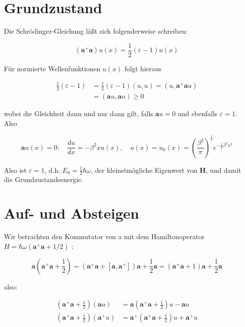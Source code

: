 \documentclass[10pt, letterpaper]{article}
\begin{document}
\section*{Grundzustand}
Die Schrödinger-Gleichung läßt sich folgenderweise schreiben:

$$
\left(\mathbf{a}^{+} \mathbf{a}\right) u(x)=\frac{1}{2}(\varepsilon-1) u(x)
$$

Für normierte Wellenfunktionen $u(x)$ folgt hieraus

$$
\begin{aligned}
\frac{1}{2}(\varepsilon-1) & =\frac{1}{2}(\varepsilon-1)(u, u)=\left(u, \mathbf{a}^{+} \mathbf{a} u\right) \\
& =(\mathbf{a} u, \mathbf{a} u) \geq 0
\end{aligned}
$$

wobei die Gleichheit dann und nur dann gilt, falls $\mathbf{a} u=0$ und ebenfalls $\varepsilon=1$. Also

$$
\mathbf{a} u(x)=0: \quad \frac{d u}{d x}=-\beta^{2} x u(x), \quad u(x)=u_{0}(x)=\left(\frac{\beta^{2}}{\pi}\right)^{\frac{1}{4}} e^{-\frac{1}{2} \beta^{2} x^{2}}
$$

Also ist $\varepsilon=1$, d.h. $E_{0}=\frac{1}{2} \hbar \omega$, der kleinstmögliche Eigenwert von $\mathbf{H}$, und damit die Grundzustandsenergie.

\section*{Auf- und Absteigen}
Wir betrachten den Kommutator von a mit dem Hamiltonoperator $H=\hbar \omega\left(\mathbf{a}^{+} \mathbf{a}+1 / 2\right)$ :

$$
\mathbf{a}\left(\mathbf{a}^{+} \mathbf{a}+\frac{1}{2}\right)=\left(\mathbf{a}^{+} \mathbf{a}+\left[\mathbf{a}, \mathbf{a}^{+}\right]\right) \mathbf{a}+\frac{1}{2} \mathbf{a}=\left(\mathbf{a}^{+} \mathbf{a}+1\right) \mathbf{a}+\frac{1}{2} \mathbf{a}
$$

also:

$$
\begin{aligned}
\left(\mathbf{a}^{+} \mathbf{a}+\frac{1}{2}\right)(\mathbf{a} u) & =\mathbf{a}\left(\mathbf{a}^{+} \mathbf{a}+\frac{1}{2}\right) u-\mathbf{a} u \\
\left(\mathbf{a}^{+} \mathbf{a}+\frac{1}{2}\right)\left(\mathbf{a}^{+} u\right) & =\mathbf{a}^{+}\left(\mathbf{a}^{+} \mathbf{a}+\frac{1}{2}\right) u+\mathbf{a}^{+} u
\end{aligned}
$$
\end{document}
